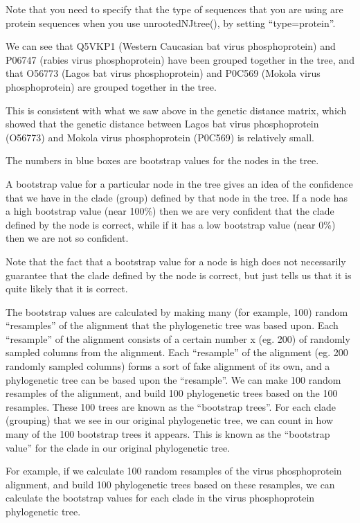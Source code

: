 \documentclass[
]{book}
\begin{document}
Note that you need to specify that the type of sequences that you are using are protein sequences when you use unrootedNJtree(), by setting ``type=protein''.

We can see that Q5VKP1 (Western Caucasian bat virus phosphoprotein) and P06747 (rabies virus phosphoprotein) have been grouped together in the tree, and that O56773 (Lagos bat virus phosphoprotein) and P0C569 (Mokola virus phosphoprotein) are grouped together in the tree.

This is consistent with what we saw above in the genetic distance matrix, which showed that the genetic distance between Lagos bat virus phosphoprotein (O56773) and Mokola virus phosphoprotein (P0C569) is relatively small.

The numbers in blue boxes are bootstrap values for the nodes in the tree.

A bootstrap value for a particular node in the tree gives an idea of the confidence that we have in the clade (group) defined by that node in the tree. If a node has a high bootstrap value (near 100\%) then we are very confident that the clade defined by the node is correct, while if it has a low bootstrap value (near 0\%) then we are not so confident.

Note that the fact that a bootstrap value for a node is high does not necessarily guarantee that the clade defined by the node is correct, but just tells us that it is quite likely that it is correct.

The bootstrap values are calculated by making many (for example, 100) random ``resamples'' of the alignment that the phylogenetic tree was based upon. Each ``resample'' of the alignment consists of a certain number x (eg. 200) of randomly sampled columns from the alignment. Each ``resample'' of the alignment (eg. 200 randomly sampled columns) forms a sort of fake alignment of its own, and a phylogenetic tree can be based upon the ``resample''. We can make 100 random resamples of the alignment, and build 100 phylogenetic trees based on the 100 resamples. These 100 trees are known as the ``bootstrap trees''. For each clade (grouping) that we see in our original phylogenetic tree, we can count in how many of the 100 bootstrap trees it appears. This is known as the ``bootstrap value'' for the clade in our original phylogenetic tree.

For example, if we calculate 100 random resamples of the virus phosphoprotein alignment, and build 100 phylogenetic trees based on these resamples, we can calculate the bootstrap values for each clade in the virus phosphoprotein phylogenetic tree.
\end{document}
